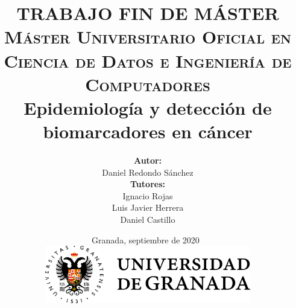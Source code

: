 \documentclass[a4paper, 12pt]{bookln9}
\begin{document}
 \pagestyle{fancyplain}
 \lhead[\fancyplain{}{\small\bf\thepage}]{\fancyplain{}{\small\bf\rightmark}}
 \rhead[\fancyplain{}{\small\bf\leftmark}]{\fancyplain{}{\small\bf\thepage}}
 \cfoot[\fancyplain{\small\bf\thepage}{}]{\fancyplain{\small\bf\thepage}{}}

\author{\textbf{Autor:}\vspace{-0.1cm}\\ Daniel Redondo Sánchez \vspace{0.2cm}\\
\textbf{Tutores:}\vspace{0.1cm}\\
Ignacio Rojas\\
Luis Javier Herrera\\
Daniel Castillo
}
	
\title{
	\vspace{-4cm}
	\centering
	{\Large TRABAJO FIN DE MÁSTER\\} \vspace{0.3cm}
	{\large \textsc{Máster Universitario Oficial en Ciencia de Datos e Ingeniería de Computadores\\}}
		{\LARGE \textbf{\bfseries{Epidemiología y detección de biomarcadores en cáncer\\}}}
		\vspace{-0.75cm}
}


\date{\vspace{1cm}
	Granada, septiembre de 2020 \\
	\vspace{0.5cm}
	\includegraphics[height=2.5cm]{logos/ugr.png} \\ 
}
	
	\mainmatter
	\maketitle
	\thispagestyle{empty}
	
	
\end{document}
